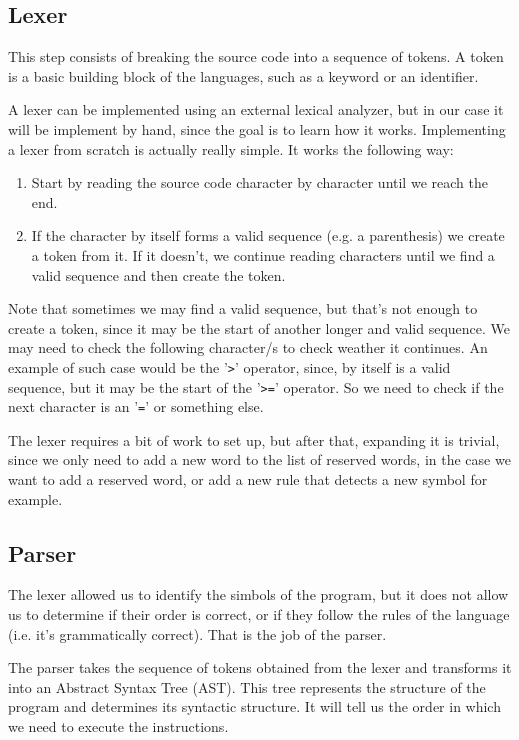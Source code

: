 ﻿\documentclass[10pt,a4paper,twocolumn,twoside]{article}
\begin{document}
\subsection{Lexer} 
This step consists of breaking the source code into a sequence of tokens. A
token is a basic building block of the languages, such as a keyword or an
identifier.

A lexer can be implemented using an external lexical analyzer, but in our case
it will be implement by hand, since the goal is to learn how it works. 
Implementing a lexer from scratch is actually really simple. It works the 
following way:

\begin{enumerate}
    \item Start by reading the source code character by character until we reach
        the end.
    \item If the character by itself forms a valid sequence (e.g. a parenthesis)
        we create a token from it. If it doesn't, we continue reading characters
        until we find a valid sequence and then create the token.
\end{enumerate}

Note that sometimes we may find a valid sequence, but that's not enough to
create a token, since it may be the start of another longer and valid sequence.
We may need to check the following character/s to check weather it continues. An
example of such case would be the '\texttt{>}' operator, since, by itself is a
valid sequence, but it may be the start of the '\texttt{>=}' operator. So we
need to check if the next character is an '\texttt{=}' or something else.

The lexer requires a bit of work to set up, but after that, expanding it is 
trivial, since we only need to add a new word to the list of reserved words, in 
the case we want to add a reserved word, or add a new rule that detects a new 
symbol for example.


\subsection{Parser}
The lexer allowed us to identify the simbols of the program, but it does not 
allow us to determine if their order is correct, or if they follow the rules of
the language (i.e. it's grammatically correct). That is the job of the parser.

The parser takes the sequence of tokens obtained from the lexer and
transforms it into an Abstract Syntax Tree (AST). This tree represents the
structure of the program and determines its syntactic structure. It will tell us
the order in which we need to execute the instructions.
\end{document}
